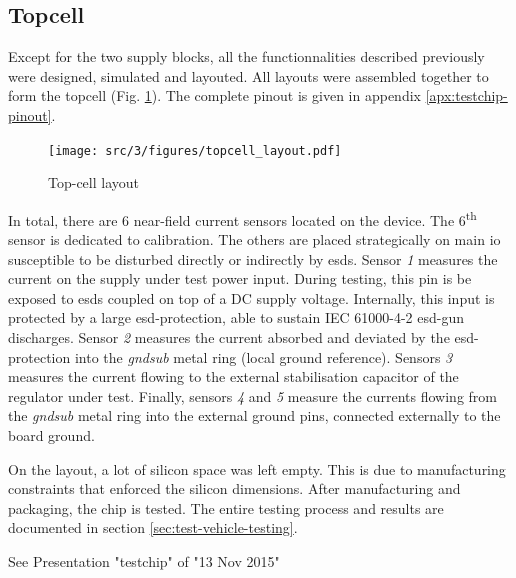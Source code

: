 \subsection{Topcell}
Except for the two supply blocks, all the functionnalities described previously were designed, simulated and layouted.
All layouts were assembled together to form the topcell (Fig. \ref{fig:top-cell-layout}).
The complete pinout is given in appendix \ref{apx:testchip-pinout}.

\begin{figure}[!h]
  \centering
  \texttt{[image: src/3/figures/topcell\_layout.pdf]}
  \caption{Top-cell layout}
  \label{fig:top-cell-layout}
\end{figure}

In total, there are 6 near-field current sensors located on the device.
The 6\textsuperscript{th} sensor is dedicated to calibration.
The others are placed strategically on main \gls{io} susceptible to be disturbed directly or indirectly by \gls{esd}s.
Sensor \textit{1} measures the current on the supply under test power input.
During testing, this pin is be exposed to \gls{esd}s coupled on top of a DC supply voltage.
Internally, this input is protected by a large \gls{esd-protection}, able to sustain IEC 61000-4-2 \gls{esd-gun} discharges.
Sensor \textit{2} measures the current absorbed and deviated by the \gls{esd-protection} into the \textit{gndsub} metal ring (local ground reference).
Sensors \textit{3} measures the current flowing to the external stabilisation capacitor of the regulator under test.
Finally, sensors \textit{4} and \textit{5} measure the currents flowing from the \textit{gndsub} metal ring into the external ground pins, connected externally to the board ground.

On the layout, a lot of silicon space was left empty.
This is due to manufacturing constraints that enforced the silicon dimensions.
After manufacturing and packaging, the chip is tested.
The entire testing process and results are documented in section \ref{sec:test-vehicle-testing}.

See Presentation "testchip" of "13 Nov 2015"

